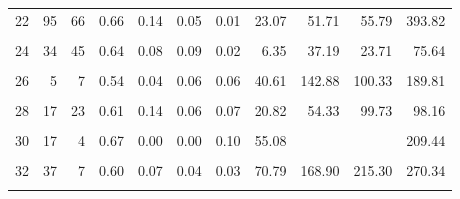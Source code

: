 \documentclass[
]{article}
\begin{document}
\begin{table}
\begin{tabular}[t]{lrrrrrrrrrr}
22 & 95 & 66 & 0.66 & 0.14 & 0.05 & 0.01 & 23.07 & 51.71 & 55.79 & 393.82\\
\cellcolor{gray!6}{23} & \cellcolor{gray!6}{100} & \cellcolor{gray!6}{141} & \cellcolor{gray!6}{0.74} & \cellcolor{gray!6}{0.08} & \cellcolor{gray!6}{0.06} & \cellcolor{gray!6}{0.02} & \cellcolor{gray!6}{22.59} & \cellcolor{gray!6}{52.21} & \cellcolor{gray!6}{72.25} & \cellcolor{gray!6}{296.70}\\
24 & 34 & 45 & 0.64 & 0.08 & 0.09 & 0.02 & 6.35 & 37.19 & 23.71 & 75.64\\
\cellcolor{gray!6}{25} & \cellcolor{gray!6}{30} & \cellcolor{gray!6}{80} & \cellcolor{gray!6}{0.64} & \cellcolor{gray!6}{0.06} & \cellcolor{gray!6}{0.09} & \cellcolor{gray!6}{0.02} & \cellcolor{gray!6}{8.67} & \cellcolor{gray!6}{37.68} & \cellcolor{gray!6}{24.51} & \cellcolor{gray!6}{88.82}\\
26 & 5 & 7 & 0.54 & 0.04 & 0.06 & 0.06 & 40.61 & 142.88 & 100.33 & 189.81\\
\cellcolor{gray!6}{27} & \cellcolor{gray!6}{34} & \cellcolor{gray!6}{7} & \cellcolor{gray!6}{0.72} & \cellcolor{gray!6}{0.08} & \cellcolor{gray!6}{0.01} & \cellcolor{gray!6}{0.07} & \cellcolor{gray!6}{52.25} & \cellcolor{gray!6}{198.15} & \cellcolor{gray!6}{329.63} & \cellcolor{gray!6}{245.41}\\
28 & 17 & 23 & 0.61 & 0.14 & 0.06 & 0.07 & 20.82 & 54.33 & 99.73 & 98.16\\
\cellcolor{gray!6}{29} & \cellcolor{gray!6}{67} & \cellcolor{gray!6}{34} & \cellcolor{gray!6}{0.61} & \cellcolor{gray!6}{0.19} & \cellcolor{gray!6}{0.05} & \cellcolor{gray!6}{0.04} & \cellcolor{gray!6}{19.04} & \cellcolor{gray!6}{49.68} & \cellcolor{gray!6}{77.84} & \cellcolor{gray!6}{94.82}\\
30 & 17 & 4 & 0.67 & 0.00 & 0.00 & 0.10 & 55.08 &  &  & 209.44\\
\cellcolor{gray!6}{31} & \cellcolor{gray!6}{44} & \cellcolor{gray!6}{7} & \cellcolor{gray!6}{0.36} & \cellcolor{gray!6}{0.34} & \cellcolor{gray!6}{0.05} & \cellcolor{gray!6}{0.16} & \cellcolor{gray!6}{112.18} & \cellcolor{gray!6}{102.91} & \cellcolor{gray!6}{277.17} & \cellcolor{gray!6}{158.48}\\
32 & 37 & 7 & 0.60 & 0.07 & 0.04 & 0.03 & 70.79 & 168.90 & 215.30 & 270.34\\
\cellcolor{gray!6}{33} & \cellcolor{gray!6}{5} & \cellcolor{gray!6}{11} & \cellcolor{gray!6}{0.47} & \cellcolor{gray!6}{0.00} & \cellcolor{gray!6}{0.15} & \cellcolor{gray!6}{0.01} & \cellcolor{gray!6}{7.86} & \cellcolor{gray!6}{} & \cellcolor{gray!6}{25.75} & \cellcolor{gray!6}{124.32}\\

\end{tabular}
\end{table}
\end{document}
